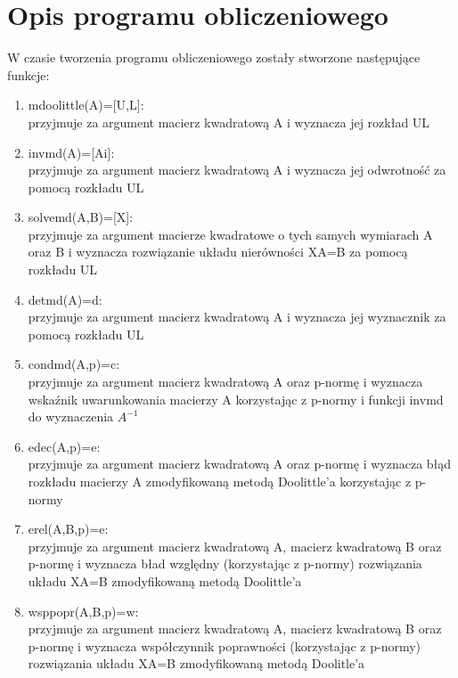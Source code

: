 \documentclass[12pt]{article}
\begin{document}
\vskip20pt

\section{Opis programu obliczeniowego}

W czasie tworzenia programu obliczeniowego zosta\l{}y stworzone nast\k{e}puj\k{a}ce funkcje:
\begin{enumerate}
\item mdoolittle(A)=[U,L]:
\\
przyjmuje za argument macierz kwadratow\k{a} A i wyznacza jej rozk\l{}ad UL

\item invmd(A)=[Ai]:
\\
przyjmuje za argument macierz kwadratow\k{a} A i wyznacza jej odwrotno\'s\'c za pomoc\k{a} rozk\l{a}du UL
 
\item solvemd(A,B)=[X]:
\\
przyjmuje za argument macierze kwadratowe o tych samych wymiarach A oraz B i wyznacza rozwi\k{a}zanie uk\l{}adu nier\'owno\'sci XA=B za pomoc\k{a} rozk\l{}adu UL

\item detmd(A)=d:
\\
przyjmuje za argument macierz kwadratow\k{a} A i wyznacza jej wyznacznik za pomoc\k{a} rozk\l{}adu UL

\item condmd(A,p)=c:
\\
przyjmuje za argument macierz kwadratow\k{a} A oraz p-norm\k{e} i wyznacza wska\'znik uwarunkowania macierzy A korzystaj\k{a}c z p-normy i funkcji invmd do wyznaczenia $A^{-1}$

\item edec(A,p)=e:
\\
przyjmuje za argument macierz kwadratow\k{a} A oraz p-norm\k{e} i wyznacza b\l{}\k{a}d rozk\l{}adu macierzy A zmodyfikowan\k{a} metod\k{a} Doolittle'a korzystaj\k{a}c z p-normy

\item erel(A,B,p)=e:
\\
przyjmuje za argument macierz kwadratow\k{a} A, macierz kwadratow\k{a} B oraz p-norm\k{e} i wyznacza b\l{a}d wzgl\k{e}dny (korzystaj\k{a}c z p-normy) rozwi\k{a}zania uk\l{}adu XA=B zmodyfikowan\k{a} metod\k{a} Doolittle'a

\item wsppopr(A,B,p)=w:
\\
przyjmuje za argument macierz kwadratow\k{a} A, macierz kwadratow\k{a} B oraz p-norm\k{e} i wyznacza wsp\'o\l{}czynnik poprawno\'sci (korzystaj\k{a}c z p-normy) rozwi\k{a}zania uk\l{}adu XA=B zmodyfikowan\k{a} metod\k{a} Doolitle'a


\end{enumerate}
\end{document}
